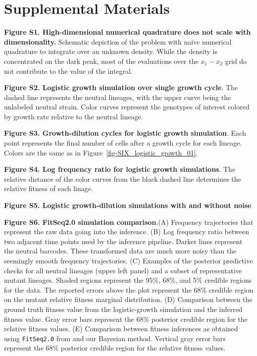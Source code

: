 \documentclass[
]{scrartcl}
\begin{document}
\hypertarget{supp_figs}{%
\section*{Supplemental Materials}\label{supp_figs}}

\textbf{Figure S1. High-dimensional numerical quadrature does not scale with
dimensionality.} Schematic depiction of the problem with naive numerical
quadrature to integrate over an unknown density. While the density is
concentrated on the dark peak, most of the evaluations over the \(x_1-x_2\) grid
do not contribute to the value of the integral.

\textbf{Figure S2. Logistic growth simulation over single growth cycle}. The
dashed line represents the neutral lineages, with the upper curve being the
unlabeled neutral strain. Color curves represent the genotypes of interest
colored by growth rate relative to the neutral lineage.

\textbf{Figure S3. Growth-dilution cycles for logistic growth simulation}. Each
point represents the final number of cells after a growth cycle for each
lineage. Colors are the same as in Figure~\ref{fig-SIX_logistic_growth_01}.

\textbf{Figure S4. Log frequency ratio for logistic growth simulations}. The
relative distance of the color curves from the black dashed line determines the
relative fitness of each linage.

\textbf{Figure S5. Logistic growth-dilution simulations with and without noise}

\textbf{Figure S6. FitSeq2.0 simulation comparison}.(A) Frequency trajectories
that represent the raw data going into the inference. (B) Log frequency ratio
between two adjacent time points used by the inference pipeline. Darker lines
represent the neutral barcodes. These transformed data are much more noisy than
the seemingly smooth frequency trajectories. (C) Examples of the posterior
predictive checks for all neutral lineages (upper left panel) and a subset of
representative mutant lineages. Shaded regions represent the 95\%, 68\%, and 5\%
credible regions for the data. The reported errors above the plot represent the
68\% credible region on the mutant relative fitness marginal distribution. (D)
Comparison between the ground truth fitness value from the logistic-growth
simulation and the inferred fitness value. Gray error bars represent the 68\%
posterior credible region for the relative fitness values. (E) Comparison
between fitness inferences as obtained using \texttt{FitSeq2.0} from
\textcite{li2023} and our Bayesian method. Vertical gray error bars represent
the 68\% posterior credible region for the relative fitness values.
\end{document}
